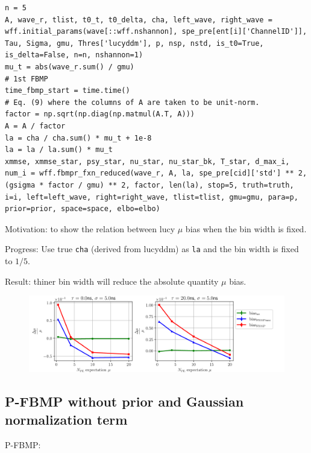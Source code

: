\documentclass[notitlepage]{article}
\begin{document}
\begin{lstlisting}
n = 5
A, wave_r, tlist, t0_t, t0_delta, cha, left_wave, right_wave = wff.initial_params(wave[::wff.nshannon], spe_pre[ent[i]['ChannelID']], Tau, Sigma, gmu, Thres['lucyddm'], p, nsp, nstd, is_t0=True, is_delta=False, n=n, nshannon=1)
mu_t = abs(wave_r.sum() / gmu)
# 1st FBMP
time_fbmp_start = time.time()
# Eq. (9) where the columns of A are taken to be unit-norm.
factor = np.sqrt(np.diag(np.matmul(A.T, A)))
A = A / factor
la = cha / cha.sum() * mu_t + 1e-8
la = la / la.sum() * mu_t
xmmse, xmmse_star, psy_star, nu_star, nu_star_bk, T_star, d_max_i, num_i = wff.fbmpr_fxn_reduced(wave_r, A, la, spe_pre[cid]['std'] ** 2, (gsigma * factor / gmu) ** 2, factor, len(la), stop=5, truth=truth, i=i, left=left_wave, right=right_wave, tlist=tlist, gmu=gmu, para=p, prior=prior, space=space, elbo=elbo)
\end{lstlisting}

Motivation: to show the relation between lucy $\mu$ bias when the bin width is fixed. 

Progress: Use true \texttt{cha} (derived from lucyddm) as \texttt{la} and the bin width is fixed to $1/5$. 

Result: thiner bin width will reduce the absolute quantity $\mu$ bias. 

\begin{figure}[H]
    \includegraphics[width=\textwidth]{vs-biasmu-lucyprior5.png}
\end{figure}

\subsection{P-FBMP \textbf{without} prior and Gaussian normalization term}

P-FBMP:
\end{document}
